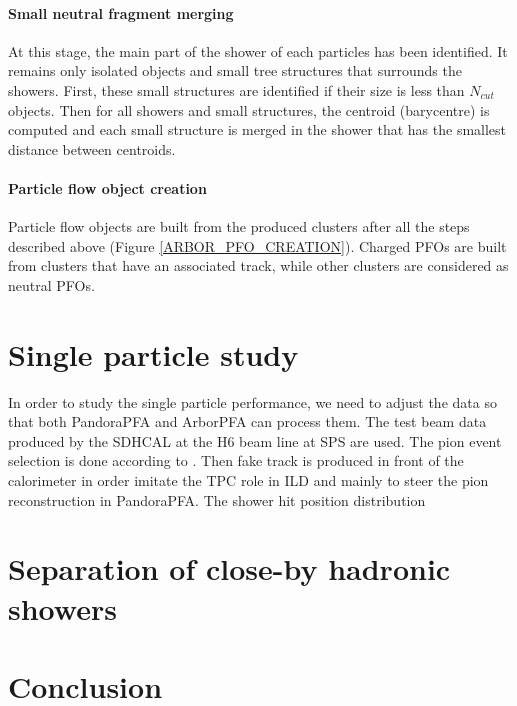 \documentclass[cits]{JINST}
\begin{document}
\paragraph*{Small neutral fragment merging} At this stage, the main part of the shower of each particles has been identified. It remains only isolated objects and small tree structures that surrounds the showers. First, these small structures are identified if their size is less than $N_{cut}$ objects. Then for all showers and small structures, the centroid (barycentre) is computed and each small structure is merged in the shower that has the smallest distance between centroids.


\paragraph*{Particle flow object creation} Particle flow objects are built from the produced clusters after all the steps described above (Figure \ref{ARBOR_PFO_CREATION}). Charged PFOs are built from clusters that have an associated track, while other clusters are considered as neutral PFOs.

\section{Single particle study}

In order to study the single particle performance, we need to adjust the data so that both PandoraPFA and ArborPFA can process them. The test beam data produced by the SDHCAL at the H6 beam line at SPS are used. The pion event selection is done according to \cite{sdhcal-paper}. Then fake track is produced in front of the calorimeter in order imitate the TPC role in ILD and mainly to steer the pion reconstruction in PandoraPFA. The shower hit position distribution



\section{Separation of close-by hadronic showers}


\section{Conclusion} 
\end{document}
